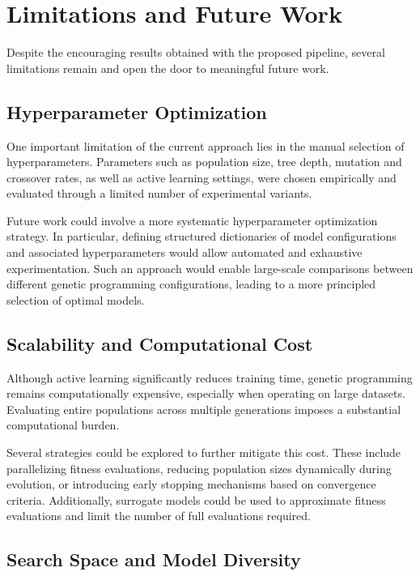 \documentclass[12pt,a4paper]{article}
\begin{document}
\section{Limitations and Future Work}

Despite the encouraging results obtained with the proposed pipeline, several limitations remain and open the door to meaningful future work.

\medskip

\subsection{Hyperparameter Optimization}

One important limitation of the current approach lies in the manual selection of hyperparameters. Parameters such as population size, tree depth, mutation and crossover rates, as well as active learning settings, were chosen empirically and evaluated through a limited number of experimental variants.

Future work could involve a more systematic hyperparameter optimization strategy. In particular, defining structured dictionaries of model configurations and associated hyperparameters would allow automated and exhaustive experimentation. Such an approach would enable large-scale comparisons between different genetic programming configurations, leading to a more principled selection of optimal models.

\medskip

\subsection{Scalability and Computational Cost}

Although active learning significantly reduces training time, genetic programming remains computationally expensive, especially when operating on large datasets. Evaluating entire populations across multiple generations imposes a substantial computational burden.

Several strategies could be explored to further mitigate this cost. These include parallelizing fitness evaluations, reducing population sizes dynamically during evolution, or introducing early stopping mechanisms based on convergence criteria. Additionally, surrogate models could be used to approximate fitness evaluations and limit the number of full evaluations required.

\medskip

\subsection{Search Space and Model Diversity}
\end{document}
